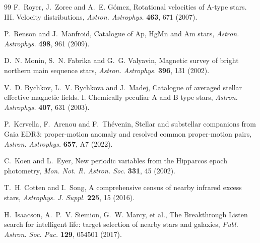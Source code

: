 \documentclass[3p,11pt]{elsarticle}
\begin{document}
\begin{thebibliography}{99}
F.~Royer, J.~Zorec and A.~E. G\'omez, Rotational velocities of A-type stars. III.
Velocity distributions, \emph{Astron. Astrophys.} \textbf{463}, 671 (2007).

P.~Renson and J.~Manfroid, Catalogue of Ap, HgMn and Am stars, \emph{Astron. Astrophys.}
\textbf{498}, 961 (2009).

D.~N. Monin, S.~N. Fabrika and G.~G. Valyavin, Magnetic survey of bright northern main
sequence stars, \emph{Astron. Astrophys.} \textbf{396}, 131 (2002).

V.~D. Bychkov, L.~V. Bychkova and J.~Madej, Catalogue of averaged stellar effective
magnetic fields. I. Chemically peculiar A and B type stars, \emph{Astron. Astrophys.}
\textbf{407}, 631 (2003).

P.~Kervella, F.~Arenou and F.~Th\'evenin, Stellar and substellar companions from Gaia
EDR3: proper-motion anomaly and resolved common proper-motion pairs, \emph{Astron.
Astrophys.} \textbf{657}, A7 (2022).

C.~Koen and L.~Eyer, New periodic variables from the Hipparcos epoch photometry,
\emph{Mon. Not. R. Astron. Soc.} \textbf{331}, 45 (2002).

T.~H. Cotten and I.~Song, A comprehensive census of nearby infrared excess stars,
\emph{Astrophys. J. Suppl.} \textbf{225}, 15 (2016).

H.~Isaacson, A.~P.~V. Siemion, G.~W. Marcy, et al., The Breakthrough Listen search for
intelligent life: target selection of nearby stars and galaxies, \emph{Publ. Astron.
Soc. Pac.} \textbf{129}, 054501 (2017).

\end{thebibliography}
\end{document}
